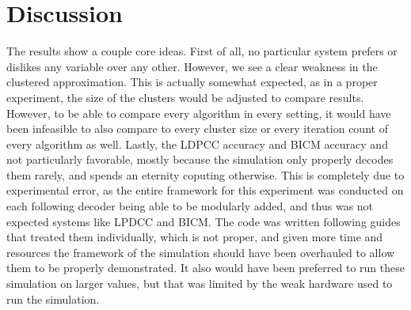 \documentclass[conference]{IEEEtran}
\begin{document}
\section{Discussion}
The results show a couple core ideas. First of all, no particular system prefers or dislikes any variable over any other. However, we see a clear weakness in the clustered approximation. This is actually somewhat expected, as in a proper experiment, the size of the clusters would be adjusted to compare results. However, to be able to compare every algorithm in every setting, it would have been infeasible to also compare to every cluster size or every iteration count of every algorithm as well. Lastly, the LDPCC accuracy and BICM accuracy and not particularly favorable, mostly because the simulation only properly decodes them rarely, and spends an eternity coputing otherwise. This is completely due to experimental error, as the entire framework for this experiment was conducted on each following decoder being able to be modularly added, and thus was not expected systems like LPDCC and BICM. The code was written following guides that treated them individually, which is not proper, and given more time and resources the framework of the simulation should have been overhauled to allow them to be properly demonstrated. It also would have been preferred to run these simulation on larger values, but that was limited by the weak hardware used to run the simulation.
\end{document}
